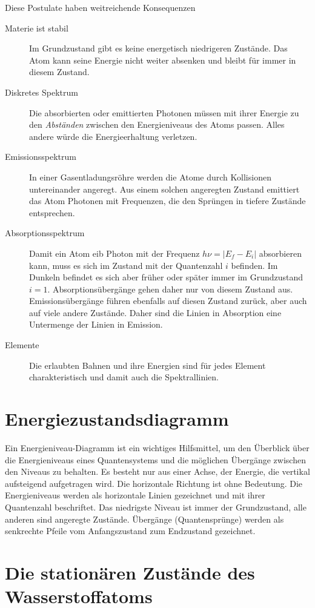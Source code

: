 Diese Postulate haben weitreichende Konsequenzen
\begin{description}
    \item[Materie ist stabil] Im Grundzustand gibt es keine energetisch niedrigeren Zustände. Das Atom kann seine Energie nicht weiter absenken und bleibt für immer in diesem Zustand.
    \item[Diskretes Spektrum] Die absorbierten oder emittierten Photonen müssen mit ihrer Energie zu den \emph{Abständen} zwischen den Energieniveaus des Atoms passen. Alles andere würde die Energieerhaltung verletzen.
    \item[Emissionsspektrum] In einer Gasentladungsröhre werden die Atome durch Kollisionen untereinander angeregt. Aus einem solchen  angeregten Zustand emittiert das Atom Photonen mit Frequenzen, die den Sprüngen in tiefere Zustände entsprechen.
    \item[Absorptionsspektrum] Damit ein Atom eib Photon mit der Frequenz $ h \nu = | E_f - E_i |$ absorbieren kann, muss es sich im Zustand mit der Quantenzahl $i$ befinden. Im Dunkeln befindet es sich aber früher oder später immer im Grundzustand $i=1$. Absorptionsübergänge gehen daher nur von diesem Zustand aus. Emissionsübergänge führen ebenfalls auf diesen Zustand zurück, aber auch auf viele andere Zustände. Daher sind die Linien in Absorption eine Untermenge der Linien in Emission.
    \item[Elemente] Die erlaubten Bahnen und ihre Energien sind für jedes Element charakteristisch und damit auch die Spektrallinien. 
\end{description}


\section{Energiezustandsdiagramm}

Ein Energieniveau-Diagramm ist ein wichtiges Hilfsmittel, um den Überblick über die Energieniveaus eines Quantensystems und die möglichen Übergänge zwischen den Niveaus zu behalten. Es besteht nur aus einer Achse, der Energie, die vertikal aufsteigend aufgetragen wird. Die horizontale Richtung ist ohne Bedeutung. Die Energieniveaus werden als horizontale Linien gezeichnet und mit ihrer Quantenzahl beschriftet. Das niedrigste Niveau ist immer der Grundzustand, alle anderen sind angeregte Zustände. Übergänge (Quantensprünge) werden als senkrechte Pfeile vom Anfangszustand zum Endzustand gezeichnet.


\section{Die stationären Zustände des Wasserstoffatoms}

